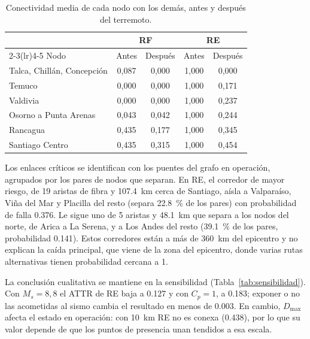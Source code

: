 \documentclass[conference]{IEEEtran}
\begin{document}
\begin{table}[t]
\centering
\caption{Conectividad media de cada nodo con los demás, antes y después del terremoto.}
\label{tab:nodos_afectados}
\footnotesize
\begin{tabular}{@{}lcccc@{}}
\toprule
 & \multicolumn{2}{c}{RF} & \multicolumn{2}{c}{RE} \\
\cmidrule(lr){2-3}\cmidrule(lr){4-5}
Nodo & Antes & Después & Antes & Después \\
\midrule
Talca, Chillán, Concepción & 0,087 & 0,000 & 1,000 & 0,000 \\
Temuco & 0,000 & 0,000 & 1,000 & 0,171 \\
Valdivia & 0,000 & 0,000 & 1,000 & 0,237 \\
Osorno a Punta Arenas & 0,043 & 0,042 & 1,000 & 0,244 \\
Rancagua & 0,435 & 0,177 & 1,000 & 0,345 \\
Santiago Centro & 0,435 & 0,315 & 1,000 & 0,454 \\
\bottomrule
\end{tabular}
\end{table}

Los enlaces críticos se identifican con los puentes del grafo en operación, agrupados por los pares de nodos que separan.
En RE, el corredor de mayor riesgo, de 19 aristas de fibra y \SI{107,4}{km} cerca de Santiago, aísla a Valparaíso, Viña del Mar y Placilla del resto (separa \SI{22,8}{\percent} de los pares) con probabilidad de falla \num{0,376}.
Le sigue uno de 5 aristas y \SI{48,1}{km} que separa a los nodos del norte, de Arica a La Serena, y a Los Andes del resto (\SI{39,1}{\percent} de los pares, probabilidad \num{0,141}).
Estos corredores están a más de \SI{360}{km} del epicentro y no explican la caída principal, que viene de la zona del epicentro, donde varias rutas alternativas tienen probabilidad cercana a 1.

La conclusión cualitativa se mantiene en la sensibilidad (Tabla~\ref{tab:sensibilidad}).
Con $M_s=8{,}8$ el ATTR de RE baja a \num{0,127} y con $C_p=1$, a \num{0,183}; exponer o no las acometidas al sismo cambia el resultado en menos de \num{0,003}.
En cambio, $D_{\max}$ afecta el estado en operación: con \SI{10}{km} RE no es conexa (\num{0,438}), por lo que su valor depende de que los puntos de presencia unan tendidos a esa escala.
\end{document}
